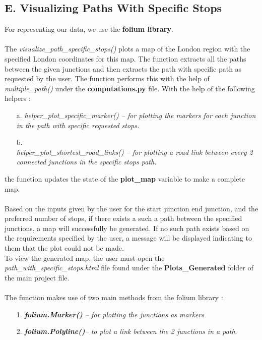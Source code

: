 \documentclass[fontsize=11pt]{IEEEtran}
\begin{document}
\begin{enumerate}
\subsection*{ E. Visualizing Paths With Specific Stops}
For representing our data, we use the \textbf{folium library}. \\ \\
The \textit{visualize\_path\_specific\_stops()} plots a map of the London region with the specified London coordinates for this map. The function extracts all the paths between the given junctions and then extracts the path with specific path as requested by the user. The function performs this with the help of \textit{multiple\_path()} under the \textbf{computations.py} file.
\newpage
With the help of the following helpers  :\\
\begin{enumerate}
    \item[a.] \textit{helper\_plot\_specific\_marker() -- for plotting the markers for each junction in the path with specific requested stops.}
    \item[b.]\\ \textit{helper\_plot\_shortest\_road\_links() -- for plotting a road link between every 2 connected junctions in the specific stops path.} \\
\end{enumerate}

the function updates the state of the \textbf{plot\_map} variable to make a complete map. \\ \\
Based on the inputs given by the user for the start junction end junction, and the preferred number of stops, if there exists a such a path between the specified junctions, a map will successfully be generated. If no such path exists based on the requirements specified by the user, a message will be displayed indicating to them that the plot could not be made. \\
To view the generated map, the user must open the \textit{path\_with\_specific\_stops.html} file found under the \textbf{Plots\_Generated} folder of the main project file.
 \\ \\
 The function makes use of two main methods from the folium library :
 \begin{enumerate}
     \item[1.] \textit{\textbf{folium.Marker()} -- for plotting the junctions as markers} \\
     \item[2.]\textit{\textbf{folium.Polyline()}-- to plot a link between the 2 junctions in a path}.
 \end{enumerate}
 \newpage

\end{enumerate}
\end{document}

